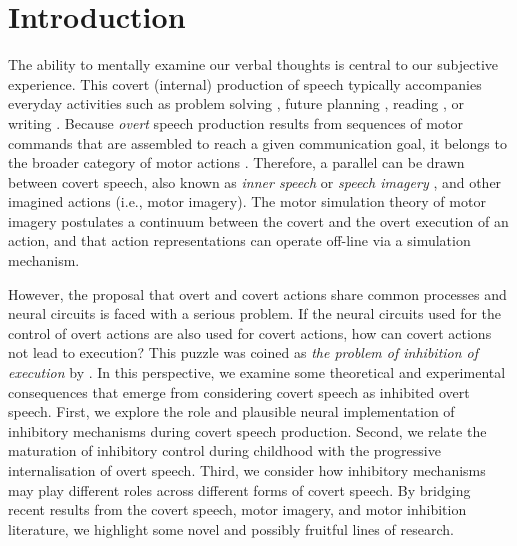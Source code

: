 \documentclass[utf8]{template/frontiersSCNS} %
\begin{document}
\newpage

\section{Introduction}

The ability to mentally examine our verbal thoughts is central to our subjective experience. This covert (internal)  production of speech typically accompanies everyday activities such as problem solving \citep{baldo_is_2005, sokolov_inner_1972}, future planning \citep{dargembeau_frequency_2011}, reading \citep[e.g.,][]{loevenbruck_left_2005, perrone-bertolotti_how_2012}, or writing \citep{frith_reading_1979}. Because \textit{overt} speech production results from sequences of motor commands that are assembled to reach a given communication goal, it belongs to the broader category of motor actions \citep{jeannerod_motor_2006}. Therefore, a parallel can be drawn between covert speech, also known as \textit{inner speech} or \textit{speech imagery} \citep[for reviews, see][]{alderson-day_inner_2015, perrone-bertolotti_what_2014, loevenbruck_cognitive_2018}, and other imagined actions (i.e., motor imagery). The motor simulation theory of motor imagery \citep{jeannerod_representing_1994, jeannerod_neural_2001, jeannerod_origin_2006} postulates a continuum between the covert and the overt execution of an action, and that action representations can operate off-line via a simulation mechanism.

However, the proposal that overt and covert actions share common processes and neural circuits is faced with a serious problem. If the neural circuits used for the control of overt actions are also used for covert actions, how can covert actions not lead to execution? This puzzle was coined as \textit{the problem of inhibition of execution} by \cite{jeannerod_neural_2001}. In this perspective, we examine some theoretical and experimental consequences that emerge from considering covert speech as inhibited overt speech. First, we explore the role and plausible neural implementation of inhibitory mechanisms during covert speech production. Second, we relate the maturation of inhibitory control during childhood with the progressive internalisation of overt speech. Third, we consider how inhibitory mechanisms may play different roles across different forms of covert speech. By bridging recent results from the covert speech, motor imagery, and motor inhibition literature, we highlight some novel and possibly fruitful lines of research.
\end{document}
